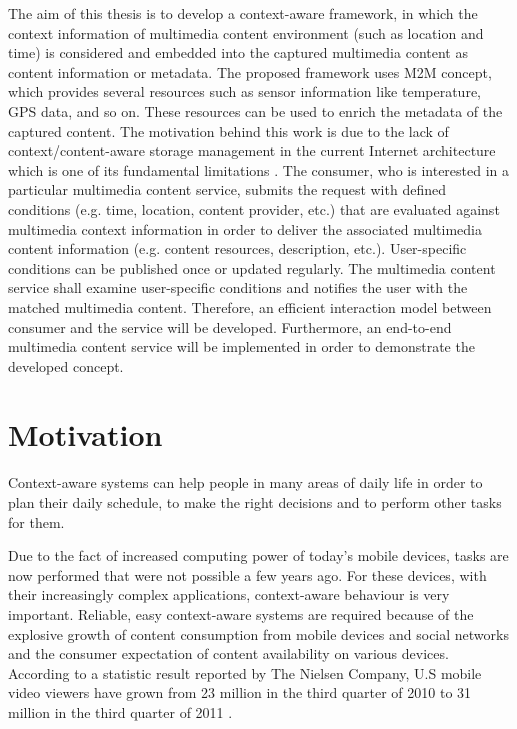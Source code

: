 The aim of this thesis is to develop a context-aware framework, in which the context information of multimedia content environment (such as location and time) is considered and embedded into the captured multimedia content as content information or metadata. The proposed framework uses \ac{M2M} concept, which provides several resources such as sensor information like temperature, \ac{GPS} data, and so on. These resources can be used to enrich the metadata of the captured content. The motivation behind this work is due to the lack of context/content-aware storage management in the current Internet architecture which is one of its fundamental limitations \cite{ec1}. The consumer, who is interested in a particular multimedia content service, submits the request with defined conditions (e.g. time, location, content provider, etc.) that are evaluated against multimedia context information in order to deliver the associated multimedia content information (e.g. content resources, description, etc.). User-specific conditions can be published once or updated regularly. The multimedia content service shall examine user-specific conditions and notifies the user with the matched multimedia content. Therefore, an efficient interaction model between consumer and the service will be developed. Furthermore, an end-to-end multimedia content service will be implemented in order to demonstrate the developed concept.

\section{Motivation\label{sec:moti}}

Context-aware systems can help people in many areas of daily life in order to plan their daily schedule, to make the right decisions  and to perform other tasks for them.

Due to the fact of increased computing power of today's mobile devices, tasks are now performed that were not possible a few years ago. For these devices, with their increasingly complex applications, context-aware behaviour is very important. Reliable, easy context-aware systems are required because of the explosive growth of content consumption from mobile devices and social networks and the consumer expectation of content availability on various devices. According to a statistic result reported by The Nielsen Company, U.S mobile video viewers have grown from 23 million in the third quarter of 2010 to 31 million in the third quarter of 2011 \cite{mobile-media-report}.

